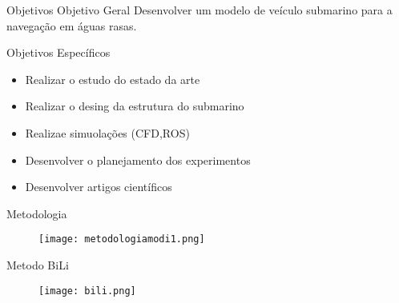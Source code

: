 \begin{frame}[t]{Objetivos}
    Objetivo Geral
    \newline
    Desenvolver um modelo de veículo submarino para a navegação em águas rasas.
    \newline

    Objetivos Específicos
    \begin{itemize}
        \item Realizar o estudo do estado da arte
        \item Realizar o desing da estrutura do submarino
        \item Realizae simuolações (CFD,ROS)
        \item Desenvolver o planejamento dos experimentos
        \item Desenvolver artigos científicos
    \end{itemize}
   

\end{frame}
\begin{frame}[c]{Metodologia }
        \begin{figure}
        \texttt{[image: metodologiamodi1.png]}
    \end{figure}
\end{frame}
\begin{frame}[c]{Metodo BiLi}
        \begin{figure}
        \texttt{[image: bili.png]}
    \end{figure}
\end{frame}
